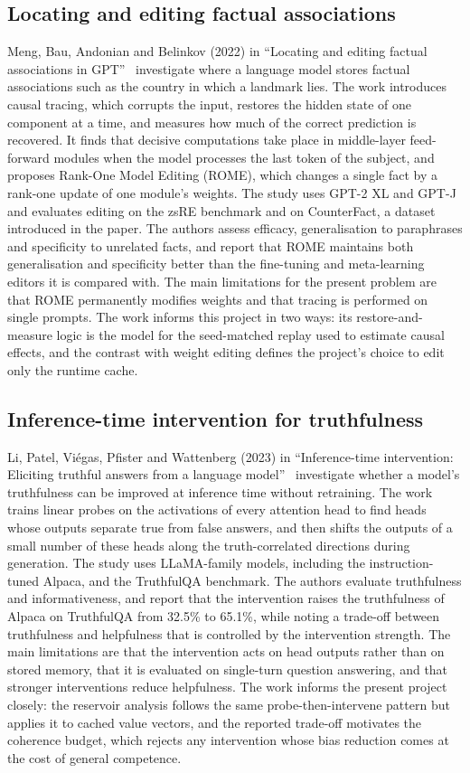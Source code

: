 \subsection{Locating and editing factual associations}\label{lit:rome}
Meng, Bau, Andonian and Belinkov (2022) in ``Locating and editing factual associations in GPT''~\cite{meng2022rome} investigate where a language model stores factual associations such as the country in which a landmark lies. The work introduces causal tracing, which corrupts the input, restores the hidden state of one component at a time, and measures how much of the correct prediction is recovered. It finds that decisive computations take place in middle-layer feed-forward modules when the model processes the last token of the subject, and proposes Rank-One Model Editing (ROME), which changes a single fact by a rank-one update of one module's weights. The study uses GPT-2 XL and GPT-J and evaluates editing on the zsRE benchmark and on CounterFact, a dataset introduced in the paper. The authors assess efficacy, generalisation to paraphrases and specificity to unrelated facts, and report that ROME maintains both generalisation and specificity better than the fine-tuning and meta-learning editors it is compared with. The main limitations for the present problem are that ROME permanently modifies weights and that tracing is performed on single prompts. The work informs this project in two ways: its restore-and-measure logic is the model for the seed-matched replay used to estimate causal effects, and the contrast with weight editing defines the project's choice to edit only the runtime cache.

\subsection{Inference-time intervention for truthfulness}\label{lit:iti}
Li, Patel, Vi\'egas, Pfister and Wattenberg (2023) in ``Inference-time intervention: Eliciting truthful answers from a language model''~\cite{li2023iti} investigate whether a model's truthfulness can be improved at inference time without retraining. The work trains linear probes on the activations of every attention head to find heads whose outputs separate true from false answers, and then shifts the outputs of a small number of these heads along the truth-correlated directions during generation. The study uses LLaMA-family models, including the instruction-tuned Alpaca, and the TruthfulQA benchmark. The authors evaluate truthfulness and informativeness, and report that the intervention raises the truthfulness of Alpaca on TruthfulQA from 32.5\% to 65.1\%, while noting a trade-off between truthfulness and helpfulness that is controlled by the intervention strength. The main limitations are that the intervention acts on head outputs rather than on stored memory, that it is evaluated on single-turn question answering, and that stronger interventions reduce helpfulness. The work informs the present project closely: the reservoir analysis follows the same probe-then-intervene pattern but applies it to cached value vectors, and the reported trade-off motivates the coherence budget, which rejects any intervention whose bias reduction comes at the cost of general competence.

